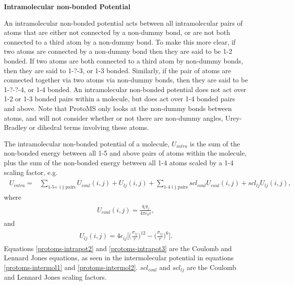 \documentclass[letterpaper,10pt,english]{sphinxmanual}
\begin{document}
\textbf{Intramolecular non-bonded Potential}

An intramolecular non-bonded potential acts between all intramolecular pairs of atoms that are either not connected by a non-dummy bond, or are not both connected to a third atom by a non-dummy bond. To make this more clear, if two atoms are connected by a non-dummy bond then they are said to be 1-2 bonded. If two atoms are both connected to a third atom by non-dummy bonds, then they are said to 1-?-3, or 1-3 bonded. Similarly, if the pair of atoms are connected together via two atoms via non-dummy bonds, then they are said to be 1-?-?-4, or 1-4 bonded. An intramolecular non-bonded potential does not act over 1-2 or 1-3 bonded pairs within a molecule, but does act over 1-4 bonded pairs and above. Note that ProtoMS only looks at the non-dummy bonds between atoms, and will not consider whether or not there are non-dummy angles, Urey-Bradley or dihedral terms involving these atoms.

The intramolecular non-bonded potential of a molecule, \(U_{intra}\) is the sum of the non-bonded energy between all 1-5 and above pairs of atoms within the molecule, plus the sum of the non-bonded energy between all 1-4 atoms scaled by a 1-4 scaling factor, e.g.
\label{protoms:equation-intrapot1}\begin{gather}
\begin{split}U_{intra} = &\sum_{\text{1-5+ i j pairs}} U_{coul}(i,j) + U_{lj}(i,j) + \sum_{\text{1-4 i j pairs}} scl_{coul} U_{coul}(i,j) + scl_{lj} U_{lj}(i,j),\end{split}\label{protoms-intrapot1}
\end{gather}
where
\label{protoms:equation-intrapot2}\begin{gather}
\begin{split}U_{coul}(i,j) = \frac{q_i q_j}{4\pi\epsilon_{0} r},\end{split}\label{protoms-intrapot2}
\end{gather}
and
\label{protoms:equation-intrapot3}\begin{gather}
\begin{split}U_{lj}(i,j) = 4\epsilon_{ij}\biggl[ \biggl(\frac{\sigma_{ij}}{r}\biggr)^{12} - \biggl(\frac{\sigma_{ij}}{r}\biggr)^6 \biggr].\end{split}\label{protoms-intrapot3}
\end{gather}
Equations \eqref{protoms-intrapot2} and \eqref{protoms-intrapot3} are the Coulomb and Lennard Jones equations, as seen in the intermolecular potential in equations \eqref{protoms-intermol1} and \eqref{protoms-intermol2}. \(scl_{coul}\) and \(scl_{lj}\) are the Coulomb and Lennard Jones scaling factors.
\end{document}
